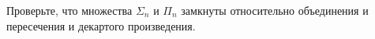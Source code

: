 Проверьте, что множества $\Sigma_n$ и $\Pi_n$ замкнуты относительно объединения и пересечения и декартого произведения.
